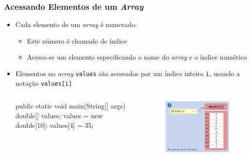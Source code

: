 \documentclass[xcolor={dvipsnames,table},aspectratio=169]{beamer}
\begin{document}
\begin{frame}[fragile]\frametitle{Acessando Elementos de um \emph{Array}}
\begin{itemize}
	\item Cada elemento de um \emph{array} é numerado:
	\begin{itemize}
		\item Este número é chamado de índice
		\item Acessa-se um elemento especificando o nome do \emph{array} e o índice numérico
	\end{itemize}
	\item Elementos no \emph{array} \texttt{values} são acessados por um índice inteiro \texttt{i}, usando a notação \texttt{values[i]}
\begin{columns}[T]
	\begin{column}{0.5\linewidth}
{\scriptsize
\begin{javacode}
public static void main(String[] args) {
  double[] values;
  values = new double[10];
  values[4] = 35;
}
\end{javacode}
}
	\end{column}
	\begin{column}{0.5\linewidth}
\begin{figure}[h]
	\includegraphics[height=0.35\paperheight,center]{pucrs-ep-fprog-unidade_06-arrays-laminas-acessando_elemento.png}
\end{figure}
	\end{column}
\end{columns}
\end{itemize}
\end{frame}
\end{document}
